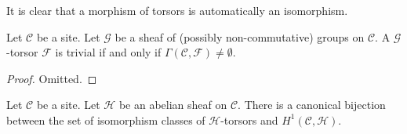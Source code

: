 \noindent
It is clear that a morphism of torsors is automatically an isomorphism.

\begin{lemma}
\label{lemma-trivial-torsor}
Let $\mathcal{C}$ be a site.
Let $\mathcal{G}$ be a sheaf of (possibly non-commutative)
groups on $\mathcal{C}$.
A $\mathcal{G}$-torsor $\mathcal{F}$ is trivial if and only if
$\Gamma(\mathcal{C}, \mathcal{F}) \not = \emptyset$.
\end{lemma}

\begin{proof}
Omitted.
\end{proof}

\begin{lemma}
\label{lemma-torsors-h1}
Let $\mathcal{C}$ be a site.
Let $\mathcal{H}$ be an abelian sheaf on $\mathcal{C}$.
There is a canonical bijection between the set of isomorphism
classes of $\mathcal{H}$-torsors and $H^1(\mathcal{C}, \mathcal{H})$.
\end{lemma}

